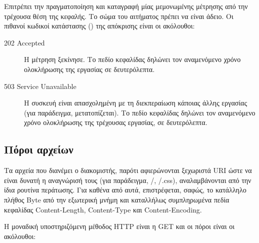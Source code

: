 Επιτρέπει την πραγματοποίηση και καταγραφή μίας μεμονωμένης μέτρησης από την
τρέχουσα θέση της κεφαλής. Το σώμα του αιτήματος πρέπει να είναι άδειο. Οι
πιθανοί κωδικοί κατάστασης () της απόκρισης είναι οι ακόλουθοι:
\begin{description}
    \item[202 Accepted] Η μέτρηση ξεκίνησε. Το πεδίο κεφαλίδας 
    δηλώνει τον αναμενόμενο χρόνο ολοκλήρωσης της εργασίας σε δευτερόλεπτα.

    \item[503 Service Unavailable] Η συσκευή είναι απασχολημένη με τη
    διεκπεραίωση κάποιας άλλης εργασίας (για παράδειγμα, μετατοπίζεται). Το
    πεδίο κεφαλίδας  δηλώνει τον αναμενόμενο χρόνο ολοκλήρωσης
    της τρέχουσας εργασίας, σε δευτερόλεπτα.
\end{description}


\subsection{Πόροι αρχείων}

Τα αρχεία που διανέμει ο διακομιστής, παρότι αφιερώνονται ξεχωριστά URI ώστε
να είναι δυνατή η αναγνώρισή τους (για παράδειγμα, /,
/.css), αναλαμβάνονται από την ίδια ρουτίνα περάτωσης. Για καθένα από
αυτά, επιστρέφεται, σαφώς, το κατάλληλο πλήθος Byte από την εξωτερική μνήμη
και καταλλήλως συμπληρωμένα πεδία κεφαλίδας Content-Length, Content-Type και Content-Encoding.

Η μοναδική υποστηριζόμενη μέθοδος HTTP είναι η GET και οι πόροι είναι οι
ακόλουθοι:
\begin{description}
\end{description}
